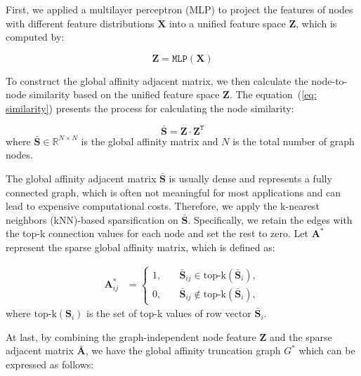 \documentclass{article}
\begin{document}
First, we applied a multilayer perceptron (MLP) to project the features of nodes with different feature distributions $\mathbf{X}$ into a unified feature space $\mathbf{Z}$, which is computed by:

\begin{equation}
{\mathbf{Z}} = \mathtt{MLP}(\mathbf{X})
\label{eq: projection}
\end{equation} 

To construct the global affinity adjacent matrix, we then calculate the node-to-node similarity based on the unified feature space $\mathbf{Z}$. The equation~(\ref{eq: similarity}) presents the process for calculating the node similarity:

\begin{equation}
\bar{\mathbf{S}} = \mathbf{Z} \cdot \mathbf{Z}^{\mathtt{T}}
\label{eq: similarity}
\end{equation}
where $\bar{\mathbf{S}}\in\mathbb{R}^{N \times N}$ is the global affinity matrix and $N$ is the total number of graph nodes.

The global affinity adjacent matrix $\bar{\mathbf{S}}$ is usually dense and represents a fully connected graph, which is often not meaningful for most applications and can lead to expensive computational costs. Therefore, we apply the k-nearest neighbors (kNN)-based sparsification on $\bar{\mathbf{S}}$. Specifically, we retain the edges with the top-k connection values for each node and set the rest to zero. Let ${\mathbf{A}}^{*}$ represent the sparse global affinity matrix, which is defined as:

\begin{equation}
\begin{aligned}
\mathbf{A}^*_{ij}&=
\begin{cases}
1,&\quad{\bar{\mathbf{S}}}_{ij}\in\text{top-k}({\bar{\mathbf{S}}}_{i}),\\0,&\quad{\bar{\mathbf{S}}}_{ij}\notin\text{top-k}({\bar{\mathbf{S}}}_{i}),
\end{cases}
\end{aligned}
\label{eq: adjacent}
\end{equation}
where $\text{top-k}({{\mathbf{S}_i}})$ is the set of top-k values of row vector ${\bar{\mathbf{S}}}_{i}$. 

At last, by combining the graph-independent node feature $\mathbf{Z}$ and the sparse adjacent matrix $\bar{\mathbf{A}}$, we have the global affinity truncation graph $G^{*}$ which can be expressed as follows:
\end{document}
